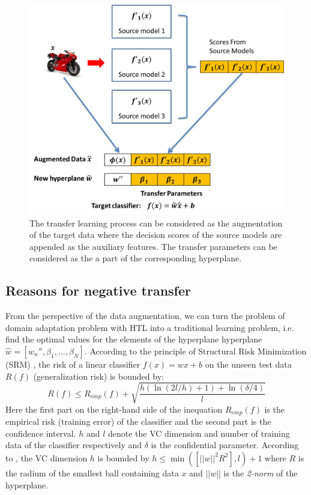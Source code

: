 \begin{figure}
\centering
\includegraphics[scale=0.4]{fig/auguement.png}
\caption{The transfer learning process can be considered as the augmentation of the target data where the decision scores of the source models are appended as the auxiliary features. The transfer parameters can be considered as the a part of the corresponding hyperplane.}\label{fig:aug}
\end{figure}

\subsection{Reasons for negative transfer}
From the perspective of the data augmentation, we can turn the problem of domain adaptation problem with HTL into a traditional learning problem, i.e. find the optimal values for the elements of the hyperplane hyperplane $\hat{w}=[w_{n}'',\beta_1,...,\beta_N]$. According to the principle of Structural Risk Minimization (SRM) \cite{vapnik1999overview}, the risk of a linear classifier $f(x)=wx+b$ on the unseen test data $R(f)$ (generalization risk) is bounded by:
\begin{equation}\label{eq:srm}
R(f) \le {R_{emp}}(f) + \sqrt {\frac{{h(\ln (2l/h) + 1) + \ln (\delta /4)}}{l}} 
\end{equation}
Here the first part on the right-hand side of the inequation ${R_{emp}}(f)$ is the empirical risk (training error) of the classifier and the second part is the confidence interval. $h$ and $l$ denote the VC dimension and number of training data of the classifier respectively and $\delta$ is the confidential parameter. According to \cite{suykens1999least}, the VC dimension $h$ is bounded by $h \le \min([||w||^2R^2],l)+1$ where $R$ is the radium of the smallest ball containing data $x$ and $||w||$ is the \textit{2-norm} of the hyperplane.

